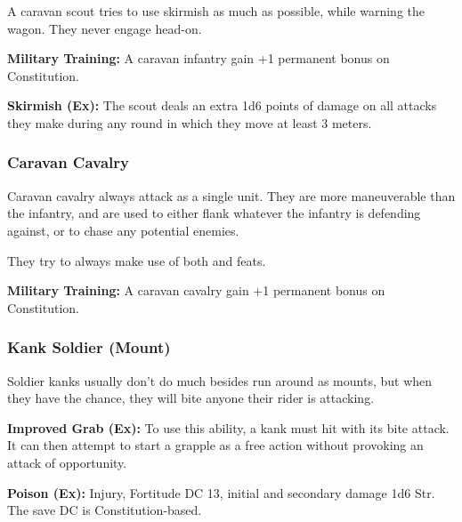 A caravan scout tries to use skirmish as much as possible, while warning the wagon. They never engage head-on.

\textbf{Military Training:} A caravan infantry gain +1 permanent bonus on Constitution.

\textbf{Skirmish (Ex):} The scout deals an extra 1d6 points of damage on all attacks they make during any round in which they move at least 3 meters.


\subsubsection{Caravan Cavalry}

Caravan cavalry always attack as a single unit. They are more maneuverable than the infantry, and are used to either flank whatever the infantry is defending against, or to chase any potential enemies.

They try to always make use of both  and  feats.

\textbf{Military Training:} A caravan cavalry gain +1 permanent bonus on Constitution.

\subsubsection{Kank Soldier (Mount)}

Soldier kanks usually don't do much besides run around as mounts, but when they have the chance, they will bite anyone their rider is attacking.

\textbf{Improved Grab (Ex):} To use this ability, a kank must hit with its bite attack. It can then attempt to start a grapple as a free action without provoking an attack of opportunity.

\textbf{Poison (Ex):} Injury, Fortitude DC 13, initial and secondary damage 1d6 Str. The save DC is Constitution-based.


